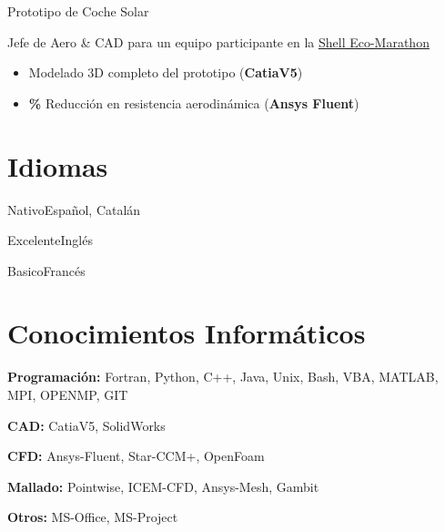 \documentclass[fontsize=10pt]{tccv_esp}
\begin{document}
\begin{eventlist}
     {Prototipo de Coche Solar}

Jefe de Aero \& CAD para un equipo participante en la
\href{http://www.shell.com/global/environment-society/ecomarathon.html}{Shell
Eco-Marathon}
\begin{itemize}
\itemsep -2pt
	\item Modelado 3D completo del prototipo (\textbf{CatiaV5})
	\item \textbf{\%} Reducci\'on en resistencia aerodin\'amica (\textbf{Ansys Fluent})
\end{itemize}
\end{eventlist}

\vspace{-20pt}
\section{Idiomas}
\begin{factlist}
\item{Nativo}{Espa\~{n}ol, Catal\'an}
\item{Excelente}{Ingl\'es}
\item{Basico}{Franc\'es}
\end{factlist}

\vspace{-20pt}
\section{Conocimientos Inform\'aticos}
\begin{factlist}
\item{\textbf{Programaci\'on:}}
     {Fortran, Python, C++, Java, Unix, Bash, VBA, MATLAB, MPI, OPENMP, GIT}
\item{\textbf{CAD:}}
     {CatiaV5, SolidWorks}
\item{\textbf{CFD:}}
     {Ansys-Fluent, Star-CCM+, OpenFoam}
\item{\textbf{Mallado:}}
     {Pointwise, ICEM-CFD, Ansys-Mesh, Gambit}
\item{\textbf{Otros:}}
     {MS-Office, MS-Project}
\end{factlist}


\vspace{-20pt}
\end{document}
